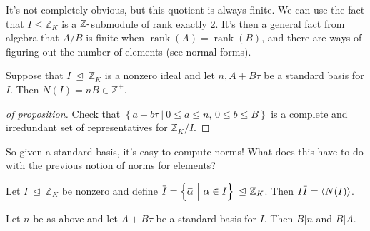 \begin{remark}

It's not completely obvious, but this quotient is always finite. We can
use the fact that \(I\leq {\mathbb{Z}}_K\) is a
\({\mathbb{Z}}{\hbox{-}}\)submodule of rank exactly 2. It's then a
general fact from algebra that \(A/B\) is finite when
\(\operatorname{rank}(A) = \operatorname{rank}(B)\), and there are ways
of figuring out the number of elements (see normal forms).

\end{remark}

\begin{proposition}

Suppose that \(I{~\trianglelefteq~}{\mathbb{Z}}_K\) is a nonzero ideal
and let \(n, A+B \tau\) be a standard basis for \(I\). Then
\(N(I) = nB \in {\mathbb{Z}}^+\).

\end{proposition}

\begin{proof}[of proposition]

Check that
\(\left\{{ a + b \tau {~\mathrel{\Big|}~}0\leq a \leq n,\, 0 \leq b \leq B}\right\}\)
is a complete and irredundant set of representatives for
\({\mathbb{Z}}_K/I\).

\end{proof}

\begin{remark}

So given a standard basis, it's easy to compute norms! What does this
have to do with the previous notion of norms for elements?

\end{remark}

\begin{theorem}

Let \(I {~\trianglelefteq~}{\mathbb{Z}}_K\) be nonzero and define
\(\mkern 1.5mu\overline{\mkern-1.5muI\mkern-1.5mu}\mkern 1.5mu = \left\{{ \mkern 1.5mu\overline{\mkern-1.5mu\alpha \mkern-1.5mu}\mkern 1.5mu{~\mathrel{\Big|}~}\alpha \in I }\right\} {~\trianglelefteq~}{\mathbb{Z}}_K\).
Then
\(I \mkern 1.5mu\overline{\mkern-1.5muI\mkern-1.5mu}\mkern 1.5mu = \left\langle{ N(I) }\right\rangle\).

\end{theorem}

\begin{lemma}

Let \(n\) be as above and let \(A + B \tau\) be a standard basis for
\(I\). Then \(B\mathrel{\Big|}n\) and \(B\mathrel{\Big|}A\).

\end{lemma}

